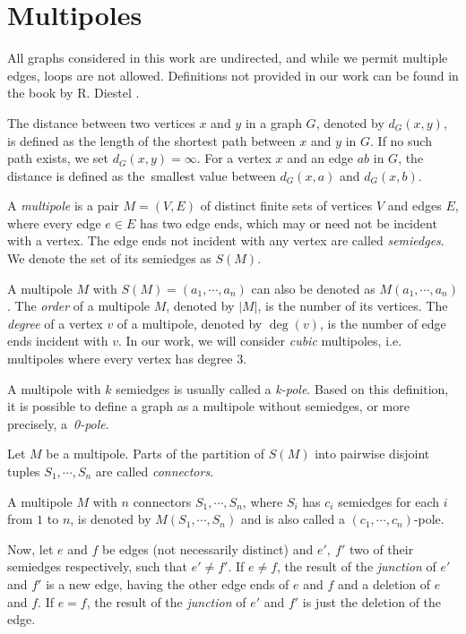 \section{Multipoles}\label{sec:multipoles}

All graphs considered in this work are undirected, and while we permit multiple edges, loops are not allowed. Definitions not provided in our work can be found in the book  by R. Diestel \cite{Diestel2010}.

The distance between two vertices $x$ and $y$ in a graph $G$, denoted by $d_G(x,y)$, is defined as the length of the shortest path between $x$ and $y$ in $G$. If no such path exists, we set $d_G(x,y)=\infty$. For a vertex $x$ and an edge $ab$ in $G$, the distance is defined as the~smallest value between $d_G(x,a)$ and $d_G(x,b)$.

A \textit{multipole} is a pair $M=(V,E)$ of distinct finite sets of vertices $V$ and edges $E$, where every edge $e\in E$ has two edge ends, which may or need not be incident with a vertex. The edge ends not incident with any vertex are called \textit{semiedges}. We denote the set of its semiedges as $S(M)$.

A multipole $M$ with $S(M) = (a_1, \cdots, a_n)$ can also be denoted as $M(a_1,\cdots,a_n)$. The \textit{order} of a multipole $M$, denoted by $|M|$, is the number of its vertices. The \textit{degree} of a vertex $v$ of a multipole, denoted by $\deg(v)$, is the number of edge ends incident with $v$. In our work, we will consider \textit{cubic} multipoles, i.e. multipoles where every vertex has degree $3$. 

A multipole with $k$ semiedges is usually called a \textit{k-pole}. Based on this definition, it is possible to define a graph as a multipole without semiedges, or more precisely, a~\textit{0-pole}.

\begin{definition}
	Let $M$ be a multipole. Parts of the partition of $S(M)$ into pairwise disjoint tuples $S_1,\cdots, S_n$ are called \textit{connectors}.
\end{definition}

A multipole $M$ with $n$ connectors $S_1,\cdots,S_n$, where $S_i$ has $c_i$ semiedges for each $i$ from $1$ to $n$, is denoted by $M(S_1,\cdots,S_n)$ and is also called a $(c_1,\cdots,c_n)$-pole.

Now, let $e$ and $f$ be edges (not necessarily distinct) and $e',~f'$ two of their semiedges respectively, such that $e'\neq f'$. If $e\neq f$, the result of the \textit{junction} of $e'$ and $f'$ is a new edge, having the other edge ends of $e$ and $f$ and a deletion of $e$ and $f$. If $e=f$, the result of the \textit{junction} of $e'$ and $f'$ is just the deletion of the edge.


